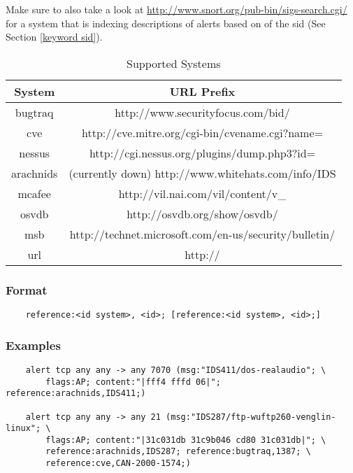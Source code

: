 \documentclass[english]{report}
\begin{document}
Make sure to also take a look at
\url{http://www.snort.org/pub-bin/sigs-search.cgi/} for a system that is
indexing descriptions of alerts based on of the sid (See Section \ref{keyword
sid}).

\begin{table}[h]
\begin{center}
\caption{Supported Systems}
\label{references systems}
\begin{tabular}{|c|c|}

\hline 
System&
URL Prefix\\
\hline

\hline 
bugtraq&
http://www.securityfocus.com/bid/\\

\hline 
cve&
http://cve.mitre.org/cgi-bin/cvename.cgi?name=\\

\hline 
nessus &
http://cgi.nessus.org/plugins/dump.php3?id=\\

\hline 
arachnids&
(currently down) http://www.whitehats.com/info/IDS\\

\hline 
mcafee&
http://vil.nai.com/vil/content/v\_\\

\hline 
osvdb&
http://osvdb.org/show/osvdb/\\

\hline 
msb&
http://technet.microsoft.com/en-us/security/bulletin/\\

\hline 
url&
http://\\

\hline
\end{tabular}
\end{center}
\end{table}

\subsubsection{Format}

\begin{verbatim}
    reference:<id system>, <id>; [reference:<id system>, <id>;]
\end{verbatim}

\subsubsection{Examples}

\begin{verbatim}
    alert tcp any any -> any 7070 (msg:"IDS411/dos-realaudio"; \
        flags:AP; content:"|fff4 fffd 06|"; reference:arachnids,IDS411;)
    
    alert tcp any any -> any 21 (msg:"IDS287/ftp-wuftp260-venglin-linux"; \
        flags:AP; content:"|31c031db 31c9b046 cd80 31c031db|"; \
        reference:arachnids,IDS287; reference:bugtraq,1387; \
        reference:cve,CAN-2000-1574;)
\end{verbatim}
\end{document}
